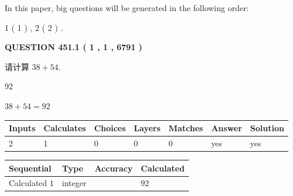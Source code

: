 \documentclass{ctexart}
\begin{document}
   
   
\vspace{0.2in}
   
In this paper, big questions will be generated in the following order: 
   
   
   1 ( 1 )
 ,
   2 ( 2 )
 .
  
\vspace{0.2in}
  
{\textbf{\Large{QUESTION
451.1 
 ( 1 , 1 , 6791 )
}}}
  
  
 
请计算 $ %
38 +  %
54 $.
 
 
 
\noindent{}
 
 

92
 
 
\noindent{}
 
 

 
 
 
\noindent{}
 
 

$ %
38 +  %
54=   %
92$
 
 
\noindent{}
 
 

 
   
   
   
   
\noindent\begin{tabular}{|l|l|l|l|l|l|l|}
 \hline
Inputs & Calculates & Choices & Layers & Matches & Answer & Solution \\ \hline
 2  & 
 1  & 
 0
  & 
 0  & 
 0  & 
  yes & 
  yes 
  \\ \hline
 \end{tabular}
   
   
   
   
\noindent{}
   
   
  
  
\noindent\begin{tabular}{|l|l|l|l|}
\hline
 Sequential & Type & Accuracy & Calculated \\ 
\hline
 
 
  Calculated $  1 $ & integer &  & 
  $ 92 $ 
 \\  \hline  
 \end{tabular}
   
\end{document}
